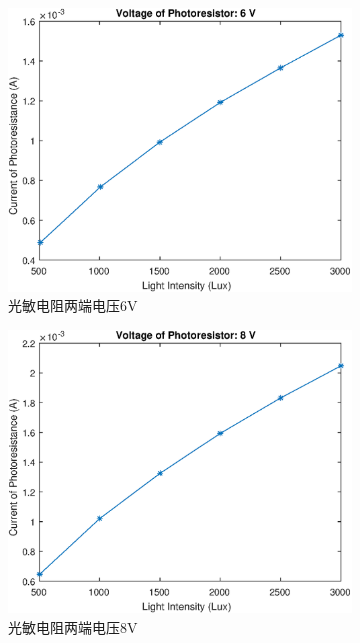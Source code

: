 \documentclass{ctexart}
\begin{document}
\begin{figure}[H]
  \begin{subfigure}{.45\textwidth}
    \centering
    \includegraphics[width=\linewidth]{光电传感器综合实验图像/photoresistor_6V}
  \caption{光敏电阻两端电压6V}
  \end{subfigure}
  \begin{subfigure}{.45\textwidth}
    \centering
    \includegraphics[width=\linewidth]{光电传感器综合实验图像/photoresistor_8V}
  \caption{光敏电阻两端电压8V}
  \end{subfigure}
  \begin{subfigure}{.45\textwidth}

\end{subfigure}
\end{figure}
\end{document}
